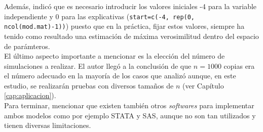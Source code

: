 Además, \textcite{COPY} indicó que es necesario introducir los valores iniciales -4 para la variable independiente y 0 para las explicativas (\lstinline{start=c(-4, rep(0, ncol(mod.mat)-1))}) puesto que en la práctica, fijar estos valores, siempre ha tenido como resultado una estimación de máxima verosimilitud dentro del espacio de parámteros. \\

El último aspecto importante a mencionar es la elección del número de simulaciones a realizar. El autor llegó a la conclusión de que $n=1000$ copias era el número adecuado en la mayoría de los casos que analizó aunque, en este estudio, se realizarán pruebas con diversos tamaños de $n$ (ver Capítulo \ref{cap:aplicacion}).\\

Para terminar, mencionar que existen también otros \textit{softwares} para implementar ambos modelos como por ejemplo STATA y SAS, aunque no son tan utilizados y tienen diversas limitaciones. \\